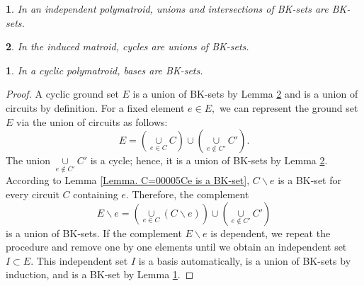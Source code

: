 \documentclass[10pt,a4paper]{amsart}
\newtheorem{lem}{}
\newtheorem{thm}{}
\begin{document}
\begin{lem}
\label{Lemma. The union and intersection of BK-sets are BK-sets}In
an independent polymatroid, unions and intersections of BK-sets are
BK-sets.
\end{lem}

\begin{lem}
\label{Lemma. Cyclics are unions of BK-sets}In the induced matroid,
cycles are unions of BK-sets.
\end{lem}

\begin{thm}
\label{Theorem. In cyclic, bases are BK}In a cyclic polymatroid,
bases are BK-sets.
\end{thm}

\begin{proof}
A cyclic ground set $E$ is a union of BK-sets by Lemma \ref{Lemma. Cyclics are unions of BK-sets}
and is a union of circuits by definition. For a fixed element $e\in E,$
we can represent the ground set $E$ via the union of circuits as
follows:
\[
E=\left(\underset{e\in C}{\cup}C\right)\cup\left(\underset{e\notin C'}{\cup}C'\right).
\]
The union $\underset{e\notin C'}{\cup}C'$ is a cycle; hence, it is
a union of BK-sets by Lemma \ref{Lemma. Cyclics are unions of BK-sets}.
According to Lemma \ref{Lemma. C=00005Ce is a BK-set}, $C\backslash e$
is a BK-set for every circuit $C$ containing $e.$ Therefore, the
complement
\[
E\backslash e=\left(\underset{e\in C}{\cup}(C\backslash e)\right)\cup\left(\underset{e\notin C'}{\cup}C'\right)
\]
is a union of BK-sets. If the complement $E\backslash e$ is dependent,
we repeat the procedure and remove one by one elements until we obtain
an independent set $I\subset E$. This independent set $I$ is a basis
automatically, is a union of BK-sets by induction, and is a BK-set
by Lemma \ref{Lemma. The union and intersection of BK-sets are BK-sets}.
\end{proof}
\end{document}
